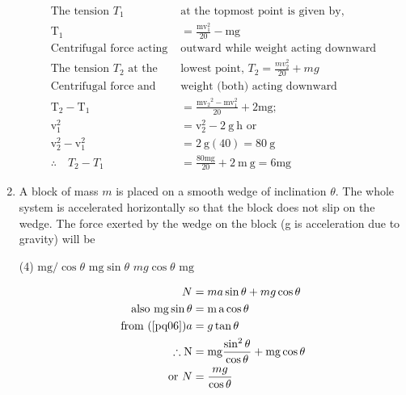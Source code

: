 \begin{enumerate}[label=\color{ocre}\textbf{\arabic*.}]
	\begin{answer}
		\begin{align*}
		\text{The tension $T_{1}$ }&\text{at the topmost point is given by,}\\
		\mathrm{T}_{1}&=\frac{\mathrm{m} \mathrm{v}_{1}^{2}}{20}-\mathrm{mg}\\
		\text{Centrifugal force acting }&\text{outward while weight acting downward}\\
		\text{The tension $T_{2}$ at the }&\text{lowest point, }T_{2}=\frac{m v_{2}^{2}}{20}+m g\\
		\text{Centrifugal force and }&\text{weight (both) acting downward}\\
		\mathrm{T}_{2}-\mathrm{T}_{1}&=\frac{\mathrm{m} \mathrm{v}_{2}{ }^{2}-\mathrm{m} \mathrm{v}_{1}^{2}}{20}+2 \mathrm{mg} ; \\ \mathrm{v}_{1}^{2}&=\mathrm{v}_{2}^{2}-2 \mathrm{~g} \mathrm{~h}\text{ or}\\
		\mathrm{v}_{2}^{2}-\mathrm{v}_{1}^{2}&=2 \mathrm{~g}(40)=80 \mathrm{~g}\\
		\therefore \quad T_{2}-T_{1}&=\frac{80 \mathrm{mg}}{20}+2 \mathrm{~m} \mathrm{~g}=6 \mathrm{mg}
		\end{align*}
	\end{answer}
	\item 
	A block of mass $m$ is placed on a smooth wedge of inclination $\theta$. The whole system is accelerated horizontally so that the block does not slip on the wedge. The force exerted by the wedge on the block (g is acceleration due to gravity) will be
	\begin{tasks}(4)
		\task[\textbf{A.}]	$\mathrm{mg} / \cos \theta$
		\task[\textbf{B.}] $\mathrm{mg} \sin \theta$
		\task[\textbf{C.}] $m g \cos \theta$
		\task[\textbf{D.}] $\mathrm{mg}$
	\end{tasks}
	\begin{answer}
		\begin{align}
		N&=m a \sin \theta+m g \cos \theta\\
		\text{also }\mathrm{m} \mathrm{g} \sin \theta&=\mathrm{m} \operatorname{a} \cos \theta\label{pq06}\\
		\text{from }(\ref{pq06}) a&=g \tan \theta\notag\\
		\therefore \mathrm{N}&=\mathrm{mg} \frac{\sin ^{2} \theta}{\cos \theta}+\mathrm{mg} \cos \theta\notag\\
		\text{or }N&=\frac{m g}{\cos \theta}\notag
		\end{align}
		\begin{figure}[H]

\end{figure}
\end{answer}
\end{enumerate}
